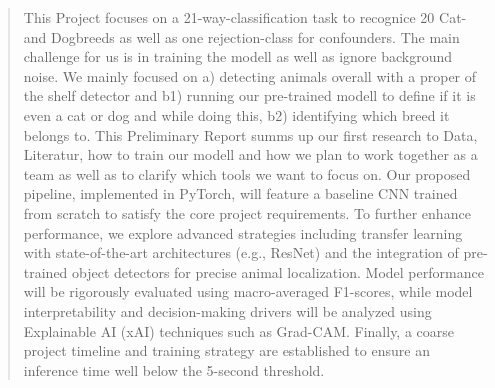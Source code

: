 \begin{abstract}
This Project focuses on a 21-way-classification task to recognice 20 Cat- and Dogbreeds as well as one rejection-class for confounders.
The main challenge for us is in training the modell as well as ignore background noise. We mainly focused on 
a) detecting animals overall with a proper of the shelf detector and b1) running our pre-trained modell to define if it is
even a cat or dog and while doing this, b2) identifying which breed it belongs to.
This Preliminary Report summs up our first research to Data, Literatur, how to train our modell and how we plan to work together as a team as well 
as to clarify which tools we want to focus on.
Our proposed pipeline, implemented in PyTorch, will feature a baseline CNN trained from scratch to satisfy the core 
project requirements. To further enhance performance, we explore advanced strategies including transfer learning 
with state-of-the-art architectures (e.g., ResNet) and the integration of pre-trained object detectors for precise 
animal localization. Model performance will be rigorously evaluated using macro-averaged F1-scores, 
while model interpretability and decision-making drivers will be analyzed using Explainable AI (xAI) techniques 
such as Grad-CAM. Finally, a coarse project timeline and training strategy are established to ensure an inference 
time well below the 5-second threshold.
\end{abstract}